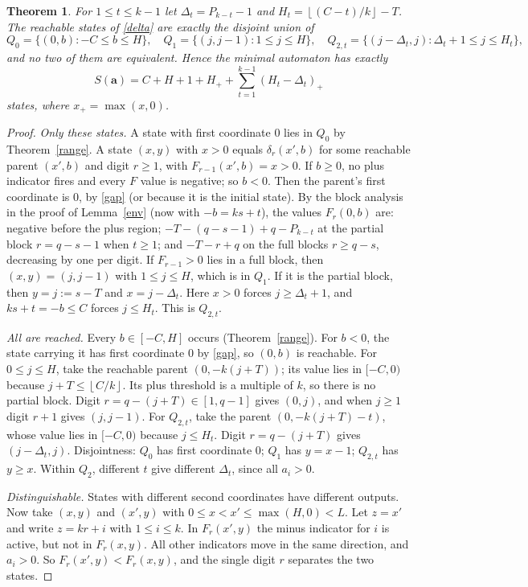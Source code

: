 \documentclass[11pt]{article}
\newtheorem{theorem}{Theorem}\newtheorem{lemma}[theorem]{Lemma}\newtheorem{proposition}[theorem]{Proposition}\newtheorem{corollary}[theorem]{Corollary}
\theoremstyle{remark}\newtheorem{remark}[theorem]{Remark}
\theoremstyle{definition}\newtheorem{definition}[theorem]{Definition}
\newcommand{\fl}[1]{\left\lfloor #1\right\rfloor}
\begin{document}
\begin{theorem}\label{states}
For \(1\le t\le k-1\) let \(\Delta_t=P_{k-t}-1\) and \(H_t=\fl{(C-t)/k}-T\). The reachable states of \eqref{delta} are exactly the disjoint union of
\[
Q_0=\{(0,b):-C\le b\le H\},\quad Q_1=\{(j,j-1):1\le j\le H\},\quad Q_{2,t}=\{(j-\Delta_t,j):\Delta_t+1\le j\le H_t\},
\]
and no two of them are equivalent. Hence the minimal automaton has exactly
\[
S(\mathbf a)=C+H+1+H_++\sum_{t=1}^{k-1}(H_t-\Delta_t)_+
\]
states, where \(x_+=\max(x,0)\).
\end{theorem}
\begin{proof}
\emph{Only these states.} A state with first coordinate \(0\) lies in \(Q_0\) by Theorem~\ref{range}. A state \((x,y)\) with \(x>0\) equals \(\delta_r(x',b)\) for some reachable parent \((x',b)\) and digit \(r\ge1\), with \(F_{r-1}(x',b)=x>0\). If \(b\ge0\), no plus indicator fires and every \(F\) value is negative; so \(b<0\). Then the parent's first coordinate is \(0\), by \eqref{gap} (or because it is the initial state). By the block analysis in the proof of Lemma~\ref{env} (now with \(-b=ks+t\)), the values \(F_r(0,b)\) are: negative before the plus region; \(-T-(q-s-1)+q-P_{k-t}\) at the partial block \(r=q-s-1\) when \(t\ge1\); and \(-T-r+q\) on the full blocks \(r\ge q-s\), decreasing by one per digit. If \(F_{r-1}>0\) lies in a full block, then \((x,y)=(j,j-1)\) with \(1\le j\le H\), which is in \(Q_1\). If it is the partial block, then \(y=j:=s-T\) and \(x=j-\Delta_t\). Here \(x>0\) forces \(j\ge\Delta_t+1\), and \(ks+t=-b\le C\) forces \(j\le H_t\). This is \(Q_{2,t}\).

\emph{All are reached.} Every \(b\in[-C,H]\) occurs (Theorem~\ref{range}). For \(b<0\), the state carrying it has first coordinate \(0\) by \eqref{gap}, so \((0,b)\) is reachable. For \(0\le j\le H\), take the reachable parent \((0,-k(j+T))\); its value lies in \([-C,0)\) because \(j+T\le\fl{C/k}\). Its plus threshold is a multiple of \(k\), so there is no partial block. Digit \(r=q-(j+T)\in[1,q-1]\) gives \((0,j)\), and when \(j\ge1\) digit \(r+1\) gives \((j,j-1)\). For \(Q_{2,t}\), take the parent \((0,-k(j+T)-t)\), whose value lies in \([-C,0)\) because \(j\le H_t\). Digit \(r=q-(j+T)\) gives \((j-\Delta_t,j)\).
Disjointness: \(Q_0\) has first coordinate \(0\); \(Q_1\) has \(y=x-1\); \(Q_{2,t}\) has \(y\ge x\). Within \(Q_2\), different \(t\) give different \(\Delta_t\), since all \(a_i>0\).

\emph{Distinguishable.} States with different second coordinates have different outputs. Now take \((x,y)\) and \((x',y)\) with \(0\le x<x'\le\max(H,0)<L\). Let \(z=x'\) and write \(z=kr+i\) with \(1\le i\le k\). In \(F_r(x',y)\) the minus indicator for \(i\) is active, but not in \(F_r(x,y)\). All other indicators move in the same direction, and \(a_i>0\). So \(F_r(x',y)<F_r(x,y)\), and the single digit \(r\) separates the two states.


\end{proof}
\end{document}
